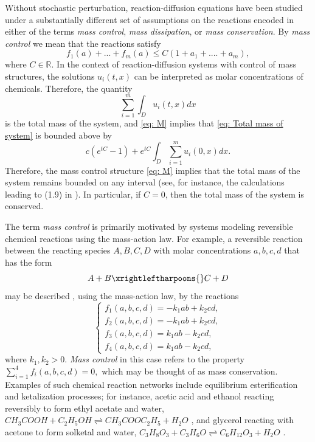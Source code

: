 \documentclass[12pt]{article}
\theoremstyle{definition}
\theoremstyle{remark}
\begin{document}
Without stochastic perturbation, reaction-diffusion equations have  been studied under a substantially different set of assumptions on the reactions encoded in either of the terms \textit{mass control}, \textit{mass dissipation}, or \textit{mass conservation}. By \textit{mass control} we mean that the 
reactions satisfy 
\begin{equation}\label{eq: M}
f_1(a)+...+f_m(a)\leq C(1+a_1+....+a_m),\tag{M}
\end{equation}
where $C\in \mathbb R$. In the context of reaction-diffusion systems with control of mass structures, the solutions $u_i(t,x)$ can be interpreted as molar concentrations of chemicals. Therefore, the quantity
\begin{equation}\label{eq: Total mass of system}
\sum_{i=1}^m \int_D u_i(t,x)dx
\end{equation}
is the total mass of the system, and \eqref{eq: M} implies that \eqref{eq: Total mass of system} is bounded above by 
\[
c(e^{tC}-1) + e^{tC}\int_D \sum_{i=1}^m u_i(0,x)dx.
\]
Therefore, the mass control structure \eqref{eq: M} implies that the total mass of the system remains bounded on any interval (see, for instance, the calculations leading to (1.9) in \cite{pierre2010global}). In particular, if $C=0$, then the total mass of the system is conserved.


The term \textit{mass control} is primarily motivated by systems modeling reversible chemical reactions using the mass-action law. For example, a reversible reaction between  the reacting species $A,B,C,D$ with molar concentrations $a,b,c,d$ that has the form
\[
A+B \xrightleftharpoons{} C+D
\]
may be described \cite{pierre2010global}, using the mass-action law, by the reactions
\begin{equation}\label{eq: A+B-><-C+D reactions}
\begin{cases}
    f_1(a,b,c,d) = -k_1ab+k_2cd,\\
    f_2(a,b,c,d) = -k_1ab+k_2cd,\\
    f_3(a,b,c,d) = k_1ab-k_2cd,\\
    f_4(a,b,c,d) = k_1ab-k_2cd,
\end{cases}
\end{equation}
where $k_1,k_2>0$.
\textit{Mass control} in this case  refers to the property  $\sum\limits_{i=1}^4 f_i(a,b,c,d) = 0,$ which may be thought of as mass conservation. Examples of such chemical reaction networks include equilibrium esterification and ketalization processes; for instance, acetic acid and ethanol reacting reversibly to form ethyl acetate and water,
$CH_3COOH + C_2H_5OH \rightleftharpoons CH_3COOC_2H_5 + H_2O$
\cite{esterification}, and glycerol reacting with acetone to form solketal and water, $
C_3H_8O_3 + C_3H_6O \rightleftharpoons C_6H_{12}O_3 + H_2O$
\cite{solketal}. 
\end{document}
